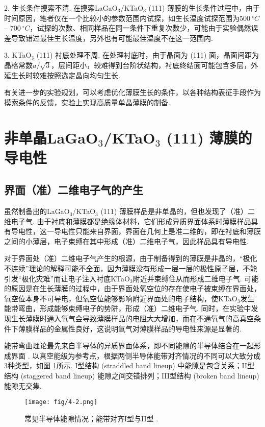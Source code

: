 \documentclass[12pt,a4paper,openany,twoside,UTF-8]{book}
\begin{document}
2. 生长条件摸索不清. 在摸索LaGaO$_3$/KTaO$_3$ (111) 薄膜的生长条件过程中，由于时间原因，笔者仅在一个比较小的参数范围内试探，如生长温度试探范围为$\SI{500}{^\circ C}$ – $\SI{700}{^\circ C}$，试探的次数、相同样品在同一条件下重复次数少，可能由于实验偶然误差导致错过最佳生长温度，另外也有可能最佳温度不在这一范围内.

3. KTaO$_3$ (111) 衬底处理不周. 在处理衬底时，由于晶面为 (111) 面，晶面间距为晶格常数$a/\sqrt{3}$，层间距小，较难得到台阶状结构，衬底终结面可能包含多层，外延生长时较难按照选定晶向均匀生长. 

有关进一步的实验规划，可以考虑优化薄膜生长的条件，以各种结构表征手段作为摸索条件的反馈，实验上实现高质量单晶薄膜的制备.

\section{非单晶LaGaO$_3$/KTaO$_3$ (111) 薄膜的导电性}
\subsection{界面（准）二维电子气的产生}
虽然制备出的LaGaO$_3$/KTaO$_3$ (111) 薄膜样品是非单晶的，但也发现了（准）二维电子气. 由于衬底和薄膜都是绝缘体材料，它们形成异质界面体系时薄膜样品具有导电性，这一导电性只能来自界面，界面在几何上是准二维的，即在衬底和薄膜之间的小薄层，电子束缚在其中形成（准）二维电子气，因此样品具有导电性. 

对于界面处（准）二维电子气产生的根源，由于制备得到的薄膜是非晶的，“极化不连续”理论的解释可能不全面，因为薄膜没有形成一层一层的极性原子层，不能引发“极化灾难”而让电子注入衬底KTaO$_3$附近并束缚住从而形成二维电子气. 可能的原因是在生长薄膜的过程中，由于界面处氧空位的存在使电子被束缚在界面处，氧空位本身不可导电，但氧空位能够影响附近界面处的电子结构，使KTaO$_3$发生能带弯曲，形成能够束缚电子的势阱，形成（准）二维电子气. 同时，在实验中发现生长薄膜时通入氧气会导致薄膜样品的电阻大大增加，而在不通氧气的高真空条件下薄膜样品的金属性良好，这说明氧气对薄膜样品的导电性来源是显著的.

能带弯曲理论最先来自半导体的异质界面体系，即不同能隙的半导体结合在一起形成界面 \cite{ref42}. 以真空能级为参考点，根据两侧半导体能带对齐情况的不同可以大致分成3种类型，如图 \ref{fig:4-2}所示. I型结构 (straddled band lineup) 中能隙是包含关系；II型结构 (staggered band lineup) 能隙之间交错排列；III型结构 (broken band lineup) 能隙无交集.

\begin{figure}[htbp]
\centering
\texttt{[image: fig/4-2.png]}
\caption{常见半导体能隙情况；能带对齐I型与II型 \cite{ref42}.}
\label{fig:4-2} 
\end{figure}
\end{document}
